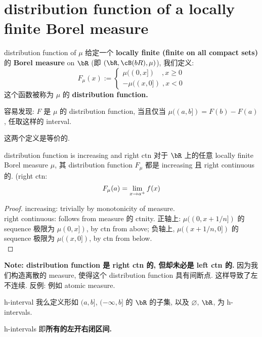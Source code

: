 \documentclass[lang=cn,11pt]{elegantbook}
\begin{document}
\section{distribution function of a locally finite Borel measure}
\begin{definition}{distribution function of $\mu$}
给定一个 \textbf{locally finite (finite on all compact sets)} 的 \textbf{Borel measure} on $\bR$ (即 $(\bR, \cB(bR), \mu)$), 我们定义:
$$
F_\mu(x ) := \begin{cases}
    \mu((0,x]) \quad  , x \geq 0 \\
     -\mu((x,0]) \; , x < 0
\end{cases}
$$
这个函数被称为 $\mu$ 的 \textbf{distribution function.}
\end{definition}

\begin{remark}
\begin{proposition}
        容易发现: $F$ 是 $\mu$ 的 distribution function, 当且仅当 $\mu((a,b]) = F(b) - F(a)$, 任取这样的 interval.
\end{proposition}
这两个定义是等价的. 
\end{remark}

\begin{theorem}{distribution function is increasing and right ctn}
对于 $\bR$ 上的任意 locally finite Borel measure $\mu$, 其 distribution function $F_\mu$ 都是 increasing 且 right continuous 的.
(right ctn:$$F_\mu(a) = \lim_{x\rightarrow a^+} f(x)$$
\end{theorem}
\begin{proof}
    increasing: trivially by monotonicity of measure.\\
    right continuous: follows from measure 的 ctnity. 正轴上: $\mu((0,x+ 1/n])$ 的 sequence 极限为 $\mu(0,x])$, by ctn from above; 负轴上, $\mu((x+ 1/n,0])$ 的 sequence 极限为 $\mu((x,0])$, by ctn from below.\\
\end{proof}
\begin{remark}
   \textbf{ Note: distribution function 是 right ctn 的, 但却未必是 left ctn 的.}
   因为我们构造离散的 measure, 使得这个 distribution function 具有间断点. 这样导致了左不连续.
   反例: 例如 atomic measure. 
\end{remark}

\begin{definition}{h-interval}
    我么定义形如 $(a,b]$, $(-\infty, b]$ 的 $\bR$  的子集, 以及 $\varnothing$, $\bR$, 为 h-intervals.
\end{definition}
h-intervals 即\textbf{所有的左开右闭区间.}
\end{document}
